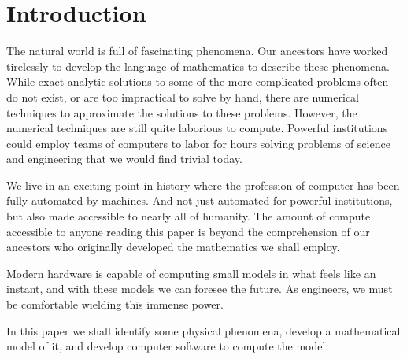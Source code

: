 \section{Introduction}

The natural world is full of fascinating phenomena. Our ancestors have worked tirelessly to develop the language of mathematics to describe these phenomena. While exact analytic solutions to some of the more complicated problems often do not exist, or are too impractical to solve by hand, there are numerical techniques to approximate the solutions to these problems. However, the numerical techniques are still quite laborious to compute. Powerful institutions could employ teams of computers to labor for hours solving problems of science and engineering that we would find trivial today. 

We live in an exciting point in history where the profession of computer has been fully automated by machines. And not just automated for powerful institutions, but also made accessible to nearly all of humanity. The amount of compute accessible to anyone reading this paper is beyond the comprehension of our ancestors who originally developed the mathematics we shall employ. 

Modern hardware is capable of computing small models in what feels like an instant, and with these models we can foresee the future. As engineers, we must be comfortable wielding this immense power. 

In this paper we shall identify some physical phenomena, develop a mathematical model of it, and develop computer software to compute the model. 

